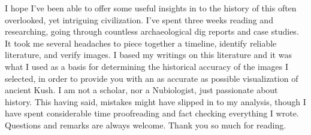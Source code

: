\documentclass[a4paper,12pt]{scrreprt}
\begin{document}
I hope I’ve been able to offer some useful insights in to the history of this often overlooked, yet intriguing civilization. I’ve spent three weeks reading and researching, going through countless archaeological dig reports and case studies. It took me several headaches to piece together a timeline, identify reliable literature, and verify images. I based my writings on this literature and it was what I used as a basis for determining the historical accuracy of the images I selected, in order to provide you with an as accurate as possible visualization of ancient Kush. I am not a scholar, nor a Nubiologist, just passionate about history. This having said, mistakes might have slipped in to my analysis, though I have spent considerable time proofreading and fact checking everything I wrote. Questions and remarks are always welcome. Thank you so much for reading.\\



\listoffigures
\end{document}

